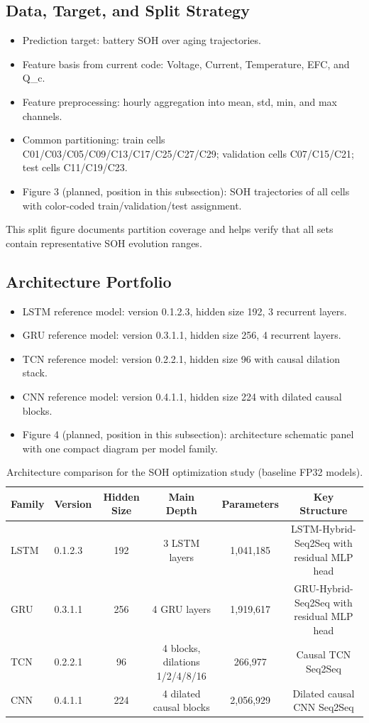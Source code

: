 ﻿\documentclass[review]{elsarticle}
\begin{document}
\subsection{Data, Target, and Split Strategy}
\begin{itemize}[leftmargin=*]
\item Prediction target: battery SOH over aging trajectories.
\item Feature basis from current code: Voltage, Current, Temperature, EFC, and Q\_c.
\item Feature preprocessing: hourly aggregation into mean, std, min, and max channels.
\item Common partitioning: train cells C01/C03/C05/C09/C13/C17/C25/C27/C29; validation cells C07/C15/C21; test cells C11/C19/C23.
\item Figure 3 (planned, position in this subsection): SOH trajectories of all cells with color-coded train/validation/test assignment.
\end{itemize}
\noindent This split figure documents partition coverage and helps verify that all sets contain representative SOH evolution ranges.

\subsection{Architecture Portfolio}
\begin{itemize}[leftmargin=*]
\item LSTM reference model: version 0.1.2.3, hidden size 192, 3 recurrent layers.
\item GRU reference model: version 0.3.1.1, hidden size 256, 4 recurrent layers.
\item TCN reference model: version 0.2.2.1, hidden size 96 with causal dilation stack.
\item CNN reference model: version 0.4.1.1, hidden size 224 with dilated causal blocks.
\item Figure 4 (planned, position in this subsection): architecture schematic panel with one compact diagram per model family.
\end{itemize}

\begin{table}[t]
\centering
\caption{Architecture comparison for the SOH optimization study (baseline FP32 models).}
\label{tab:arch_portfolio}
\small
\begin{tabular}{llcccc}
\toprule
Family & Version & Hidden Size & Main Depth & Parameters & Key Structure \\
\midrule
LSTM & 0.1.2.3 & 192 & 3 LSTM layers & 1,041,185 & LSTM-Hybrid-Seq2Seq with residual MLP head \\
GRU  & 0.3.1.1 & 256 & 4 GRU layers  & 1,919,617 & GRU-Hybrid-Seq2Seq with residual MLP head \\
TCN  & 0.2.2.1 & 96  & 4 blocks, dilations 1/2/4/8/16 & 266,977 & Causal TCN Seq2Seq \\
CNN  & 0.4.1.1 & 224 & 4 dilated causal blocks & 2,056,929 & Dilated causal CNN Seq2Seq \\
\bottomrule
\end{tabular}
\end{table}
\end{document}

